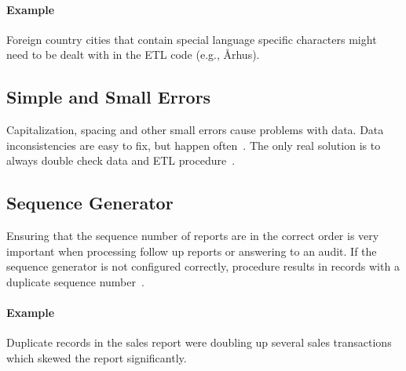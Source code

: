\paragraph*{Example} Foreign country cities that contain special language specific characters might need to be dealt with in the ETL code (e.g., Århus).


\subsection*{Simple and Small Errors}

Capitalization, spacing and other small errors cause problems with data.
Data inconsistencies are easy to fix, but happen often~\cite{web:common-defects}.
The only real solution is to always double check data and ETL procedure~\cite{web:common-defects}.


\subsection*{Sequence Generator}

Ensuring that the sequence number of reports are in the correct order is very important when processing follow up reports or answering to an audit.
If the sequence generator is not configured correctly, procedure results in records with a duplicate sequence number~\cite{web:common-defects}.

\paragraph*{Example} Duplicate records in the sales report were doubling up several sales transactions which skewed the report significantly.


